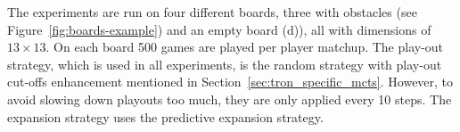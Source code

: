 \documentclass{article}
\begin{document}
The experiments are run on four different boards, three with obstacles (see Figure~\ref{fig:boards-example}) and an empty board (d)), all with dimensions of $13 \times 13$. On each board 500 games are played per player matchup.
The play-out strategy, which is used in all experiments, is the random strategy with play-out cut-offs enhancement mentioned in Section~\ref{sec:tron_specific_mcts}. 
However, to avoid slowing down playouts too much, they are only applied every 10 steps. 
The expansion strategy uses the predictive expansion strategy.

\end{document}
